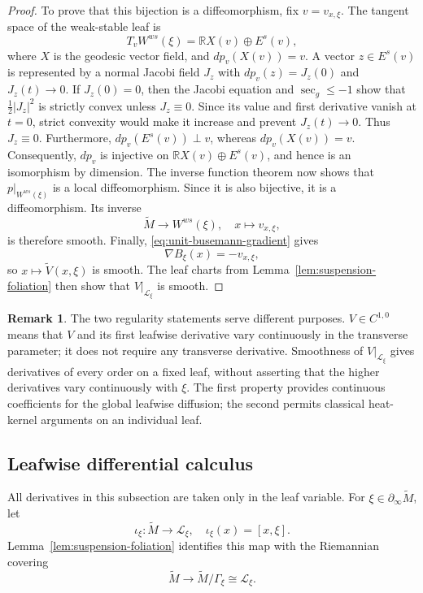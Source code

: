 \documentclass[12pt]{amsart}
\theoremstyle{definition}
\newtheorem*{unnumberedremark}{Remark}
\numberwithin{equation}{section}
\newcommand{\mc}{\mathcal}
\newcommand{\wti}{\widetilde}
\begin{document}
\begin{proof}
To prove that this bijection is a diffeomorphism, fix
\(v=v_{x,\xi}\).  The tangent space of the weak-stable leaf is
\[
  T_vW^{ws}(\xi)=\mathbb RX(v)\oplus E^s(v),
\]
where \(X\) is the geodesic vector field, and \(dp_v(X(v))=v\).
A vector \(z\in E^s(v)\) is represented by a normal Jacobi field \(J_z\)
with \(dp_v(z)=J_z(0)\) and \(J_z(t)\to0\).  If \(J_z(0)=0\), then the
Jacobi equation and \(\sec_g\leq-1\) show that
\(\frac12|J_z|^2\) is strictly convex unless \(J_z\equiv0\).  Since its
value and first derivative vanish at \(t=0\), strict convexity would make
it increase and prevent \(J_z(t)\to0\).  Thus \(J_z\equiv0\).
Furthermore, \(dp_v(E^s(v))\perp v\), whereas \(dp_v(X(v))=v\).
Consequently, \(dp_v\) is injective on
\(\mathbb RX(v)\oplus E^s(v)\), and hence is an isomorphism by dimension.
The inverse function theorem now shows that
\(p|_{W^{ws}(\xi)}\) is a local diffeomorphism.  Since it is also
bijective, it is a diffeomorphism.  Its inverse
\[
  \wti M\longrightarrow W^{ws}(\xi),
  \quad
  x\longmapsto v_{x,\xi},
\]
is therefore smooth.  Finally, \eqref{eq:unit-busemann-gradient} gives
\[
  \nabla B_\xi(x)=-v_{x,\xi},
\]
so \(x\mapsto\widetilde V(x,\xi)\) is smooth.  The leaf charts from
Lemma~\ref{lem:suspension-foliation} then show that
\(V|_{\mc L_\xi}\) is smooth.
\end{proof}

\begin{unnumberedremark}
The two regularity statements serve different purposes.
\(V\in C^{1,0}\) means that \(V\) and its first leafwise derivative vary
continuously in the transverse parameter; it does not require any
transverse derivative.  Smoothness of \(V|_{\mc L_\xi}\) gives
derivatives of every order on a fixed leaf, without asserting that the
higher derivatives vary continuously with \(\xi\).  The first property
provides continuous coefficients for the global leafwise diffusion; the
second permits classical heat-kernel arguments on an individual leaf.
\end{unnumberedremark}

\subsection{Leafwise differential calculus}

All derivatives in this subsection are taken only in the leaf variable.
For \(\xi\in\partial_\infty\wti M\), let
\[
  \iota_\xi\colon\wti M\longrightarrow\mc L_\xi,
  \quad \iota_\xi(x)=[x,\xi].
\]
Lemma~\ref{lem:suspension-foliation} identifies this map with the
Riemannian covering
\[
  \wti M\longrightarrow
  \wti M/\Gamma_\xi\cong\mc L_\xi.
\]
\end{document}
